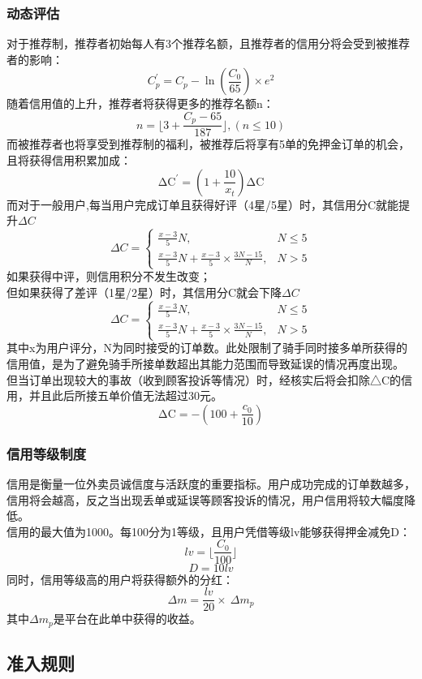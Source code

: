 \documentclass[UTF8]{ctexart}
\begin{document}
\begin{multicols}{2}
  \subsubsection{动态评估}
  对于推荐制，推荐者初始每人有3个推荐名额，且推荐者的信用分将会受到被推荐者的影响：
  $$C_p^\prime=C_p-\ln(\frac{C_0}{65})\times e^2$$
  \indent 随着信用值的上升，推荐者将获得更多的推荐名额n：
  $$n=\lfloor 3+\frac{C_p-65}{187} \rfloor ,(n \leq 10)$$
  \indent 而被推荐者也将享受到推荐制的福利，被推荐后将享有5单的免押金订单的机会，且将获得信用积累加成：
  $$\mathrm{\Delta C}^\prime=(1+\frac{10}{x_t} )\mathrm{\Delta C}$$
  \indent 而对于一般用户,每当用户完成订单且获得好评（4星/5星）时，其信用分C就能提升$\Delta C$
  $$\Delta C=\left\{
    \begin{array}{lr}
    \frac{x-3}{5} N, & {N \leq 5} \\
    \frac{x-3}{5} N + \frac{x-3}{5}\times \frac{3N-15}{N} ,& {N > 5}
  \end{array}\right.
  $$
  \indent 如果获得中评，则信用积分不发生改变；\\
  \indent 但如果获得了差评（1星/2星）时，其信用分C就会下降$\Delta C$
  $$\Delta C=\left\{
    \begin{array}{lr}
    \frac{x-3}{5} N, & {N \leq 5} \\
    \frac{x-3}{5} N + \frac{x-3}{5}\times \frac{3N-15}{N}, & {N > 5}
  \end{array}\right.
$$
  \indent 其中x为用户评分，N为同时接受的订单数。此处限制了骑手同时接多单所获得的信用值，是为了避免骑手所接单数超出其能力范围而导致延误的情况再度出现。\\
  \indent 但当订单出现较大的事故（收到顾客投诉等情况）时，经核实后将会扣除△C的信用，并且此后所接五单价值无法超过30元。
  $$\mathrm{\Delta C}=-\left(100+\frac{c_0}{10}\right)$$
  \subsubsection{信用等级制度}
  \indent 信用是衡量一位外卖员诚信度与活跃度的重要指标。用户成功完成的订单数越多，信用将会越高，反之当出现丢单或延误等顾客投诉的情况，用户信用将较大幅度降低。\\
  \indent 信用的最大值为1000。每100分为1等级，且用户凭借等级lv能够获得押金减免D：
  $$lv=\lfloor \frac{C_0}{100}\rfloor$$
  $$D=10lv$$
 同时，信用等级高的用户将获得额外的分红：
$$\Delta m=\frac{lv}{20}\times\ \Delta m_p$$
其中$\Delta m_p$是平台在此单中获得的收益。

  \subsection{准入规则}

\end{multicols}
\end{document}
